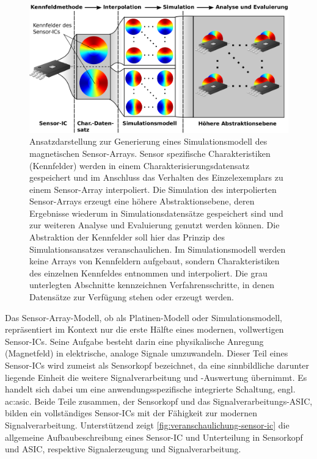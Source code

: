 \clearpage


\begin{figure}[tph]
	\centering
	\includegraphics[width=\linewidth]{chapters/images/Ansatz_Simulationsmodell}
	\caption[Ansatzdarstellung zur Generierung eines Simulationsmodell des magnetischen Sensor-Arrays]{Ansatzdarstellung zur Generierung eines Simulationsmodell des magnetischen Sensor-Arrays. Sensor spezifische Charakteristiken (Kennfelder) werden in einem Charakterisierungsdatensatz gespeichert und im Anschluss das Verhalten des Einzelexemplars zu einem Sensor-Array interpoliert. Die Simulation des interpolierten Sensor-Arrays erzeugt eine höhere Abstraktionsebene, deren Ergebnisse wiederum in Simulationsdatensätze gespeichert sind und zur weiteren Analyse und Evaluierung genutzt werden können. Die Abstraktion der Kennfelder soll hier das Prinzip des Simulationsansatzes veranschaulichen. Im Simulationsmodell werden keine Arrays von Kennfeldern aufgebaut, sondern Charakteristiken des einzelnen Kennfeldes entnommen und interpoliert. Die grau unterlegten Abschnitte kennzeichnen Verfahrensschritte, in denen Datensätze zur Verfügung stehen oder erzeugt werden.}
	\label{fig:ansatz-simulationsmodell}
\end{figure}


Das Sensor-Array-Modell, ob als Platinen-Modell oder Simulationsmodell, repräsentiert im Kontext nur die erste Hälfte eines modernen, vollwertigen Sensor-ICs. Seine Aufgabe besteht darin eine physikalische Anregung (Magnetfeld) in elektrische, analoge Signale umzuwandeln. Dieser Teil eines Sensor-ICs wird zumeist als Sensorkopf bezeichnet, da eine sinnbildliche darunter liegende Einheit die weitere Signalverarbeitung und -Auswertung übernimmt. Es handelt sich dabei um eine anwendungsspezifische integrierte Schaltung, engl. \gls{ac:asic}. Beide Teile zusammen, der Sensorkopf und das Signalverarbeitungs-ASIC, bilden ein vollständiges Sensor-ICs mit der Fähigkeit zur modernen Signalverarbeitung.
Unterstützend zeigt \autoref{fig:veranschaulichung-sensor-ic} die allgemeine Aufbaubeschreibung eines Sensor-IC und Unterteilung in Sensorkopf und ASIC, respektive Signalerzeugung und Signalverarbeitung.


